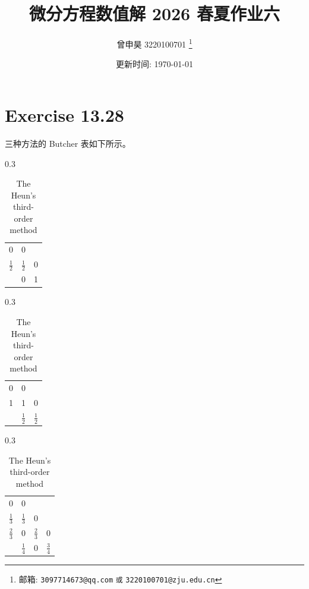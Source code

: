 \documentclass[a4paper]{article}
\begin{document}
\title{微分方程数值解 2026 春夏作业六}

\author{曾申昊 3220100701
  \thanks{邮箱: \texttt{3097714673@qq.com}
                            \texttt{或} \texttt{3220100701@zju.edu.cn}}}

\date{更新时间: \today}

\maketitle


\section*{Exercise 13.28}

\par 三种方法的 Butcher 表如下所示。

\begin{table}[htbp]
    \centering
    \caption{Butcher tableaux of different methods}
    \begin{subtable}[t]{0.3\linewidth}
        \centering
        \caption{The modified Euler method}
        \begin{tabular}{c|cc}
        0 & 0 & ~ \\
        $\frac{1}{2}$ & $\frac{1}{2}$ & 0 \\
        \hline
        ~ & 0 & 1 \\
    \end{tabular}
    \end{subtable}
    \begin{subtable}[t]{0.3\linewidth}
        \centering
        \caption{The improved Euler method}
        \begin{tabular}{c|cc}
            0 & 0 & ~ \\
            1 & 1 & 0 \\
            \hline
            ~ & $\frac{1}{2}$ & $\frac{1}{2}$ \\
        \end{tabular}
    \end{subtable}
    \begin{subtable}[t]{0.3\linewidth}
        \centering
        \caption{The Heun's third-order method}
        \begin{tabular}{c|ccc}
            0 & 0 & ~ & ~\\
            $\frac{1}{3}$ & $\frac{1}{3}$ & 0 & ~\\
            $\frac{2}{3}$ & 0 & $\frac{2}{3}$ & 0\\
            \hline
            ~ & $\frac{1}{4}$ & 0 & $\frac{3}{4}$\\
        \end{tabular}
    \end{subtable}
\end{table}
\end{document}
